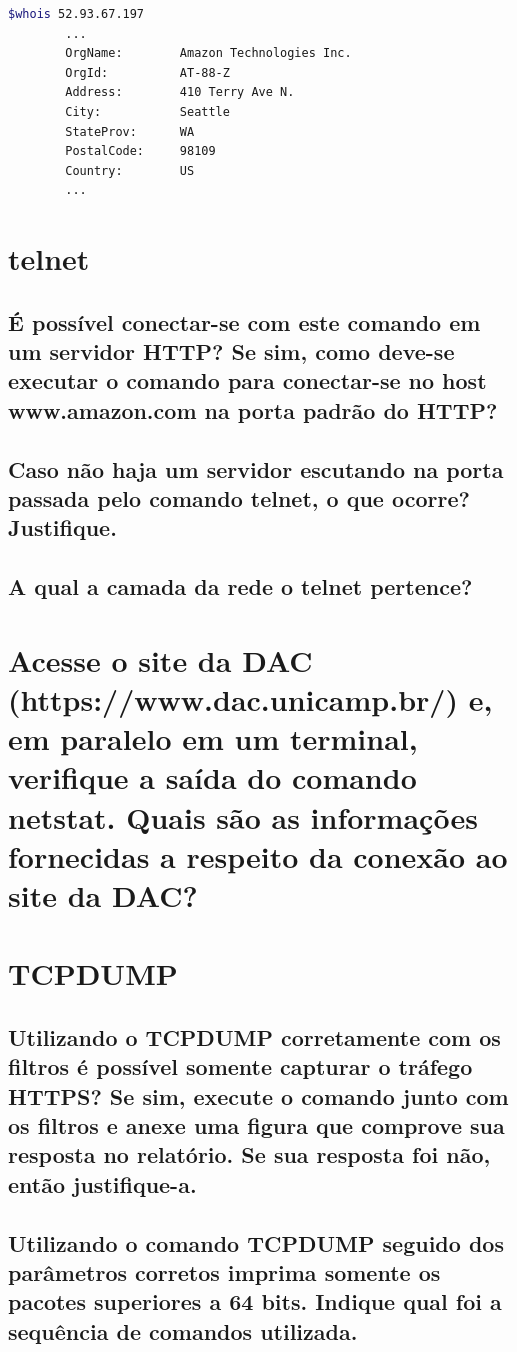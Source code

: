 \documentclass[12pt,a4paper]{report}
\begin{document}
\begin{lstlisting}[language=bash]
        $whois 52.93.67.197
        ... 
        OrgName:        Amazon Technologies Inc.
        OrgId:          AT-88-Z
        Address:        410 Terry Ave N.
        City:           Seattle
        StateProv:      WA
        PostalCode:     98109
        Country:        US
        ...
\end{lstlisting}





\section{telnet}
\subsection{É possível conectar-se com este comando em um servidor HTTP? Se sim, como deve-se executar o comando para conectar-se no host www.amazon.com na porta padrão do HTTP?}
\subsection{Caso não haja um servidor escutando na porta passada pelo comando telnet, o que ocorre? Justifique.}
\subsection{A qual a camada da rede o telnet pertence?}

\section{Acesse o site da DAC (https://www.dac.unicamp.br/) e, em paralelo em um terminal, verifique a saída do comando netstat. Quais são as informações fornecidas a respeito da conexão ao site da DAC?}

\section{TCPDUMP}
\subsection{Utilizando o TCPDUMP corretamente com os filtros é possível somente capturar o tráfego HTTPS? Se sim, execute o comando junto com os filtros e anexe uma figura que comprove sua resposta no relatório. Se sua resposta foi não, então justifique-a.}
\subsection{Utilizando o comando TCPDUMP seguido dos parâmetros corretos imprima somente os pacotes superiores a 64 bits. Indique qual foi a sequência de comandos utilizada.}
\end{document}

